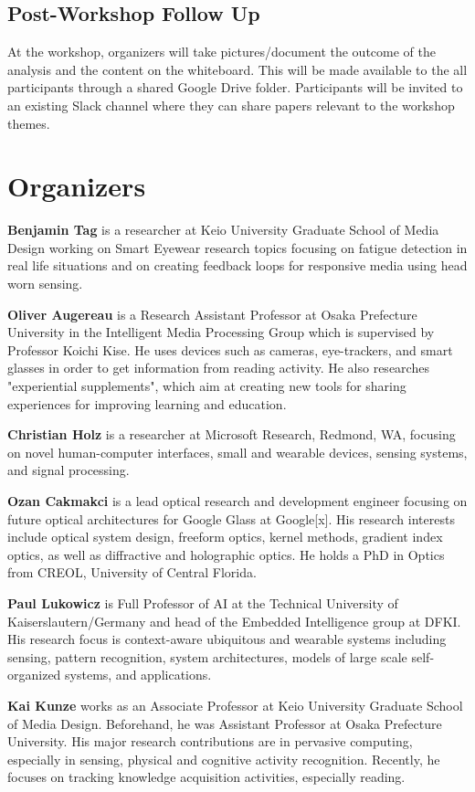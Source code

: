 \documentclass{sigchi-ext}
\begin{document}
\subsection{Post-Workshop Follow Up}
At the workshop, organizers will take pictures/document the outcome of the analysis and the content on the whiteboard. This will be made available to the all participants through a shared Google Drive folder. Participants will be invited to an existing Slack channel where they can share papers relevant to the workshop themes.

\section{Organizers}

{\bf Benjamin Tag} is a researcher at Keio University Graduate School of Media Design working on Smart Eyewear research topics focusing on fatigue detection in real life situations and on creating feedback loops for responsive media using head worn sensing.

{\bf Oliver Augereau} is a Research Assistant Professor at Osaka Prefecture University in the Intelligent Media Processing Group which is supervised by Professor Koichi Kise. He uses devices such as cameras, eye-trackers, and smart glasses in order to get information from reading activity. He also researches "experiential supplements", which aim at creating new tools for sharing experiences for improving learning and education.

{\bf Christian Holz} is a researcher at Microsoft Research, Redmond, WA, focusing on novel human-computer interfaces, small and wearable devices, sensing systems, and signal processing.

{\bf Ozan Cakmakci} is a lead optical research and development engineer focusing on future optical architectures for Google Glass at Google[x]. His research interests include optical system design, freeform optics, kernel methods, gradient index optics, as well as diffractive and holographic optics. He holds a PhD in Optics from CREOL, University of Central Florida.

{\bf Paul Lukowicz} is Full Professor of AI at the Technical University of Kaiserslautern/Germany and head of the Embedded Intelligence group at DFKI. His research focus is context-aware ubiquitous and wearable systems including sensing, pattern recognition, system architectures, models of large scale self-organized systems, and applications.

{\bf Kai Kunze} works as an Associate Professor at Keio University Graduate School of Media Design. Beforehand, he was Assistant Professor at Osaka Prefecture University. His major research contributions are in pervasive computing, especially in sensing, physical and cognitive activity recognition. Recently, he focuses on tracking knowledge acquisition activities, especially reading.
\end{document}
